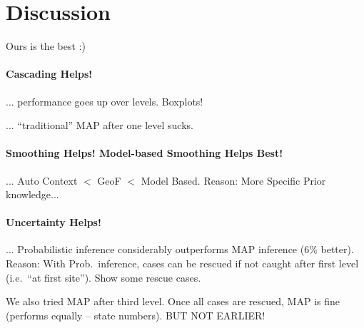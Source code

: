 \documentclass[10pt,twocolumn,letterpaper]{article}
\begin{document}
\section{Discussion}
Ours is the best :)

\paragraph{Cascading Helps!}
... performance goes up over levels. Boxplots!

... "`traditional"' MAP after one level sucks. 

\paragraph{Smoothing Helps! Model-based Smoothing Helps Best!}
... Auto Context $<$ GeoF $<$ Model Based. Reason: More Specific Prior knowledge...

\paragraph{Uncertainty Helps!}
... Probabilistic inference considerably outperforms MAP inference (6\% better). Reason: With Prob.\ inference, cases can be rescued if not caught after first level (i.e.\ "`at first site"'). Show some rescue cases. 

We also tried MAP after third level. Once all cases are rescued, MAP is fine (performs equally -- state numbers). BUT NOT EARLIER!



{\small


}
\end{document}
